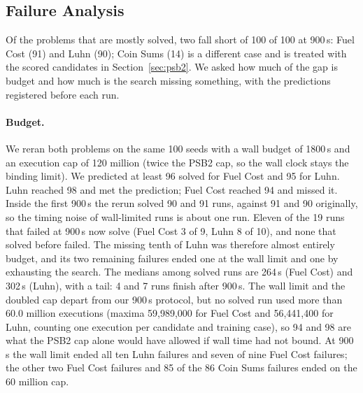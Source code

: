 \documentclass[sigconf,nonacm]{acmart}
\begin{document}
\subsection{Failure Analysis}
\label{sec:failures}
Of the problems that are mostly solved, two fall short of 100 of 100 at 900\,s: Fuel Cost (91) and Luhn (90); Coin Sums (14) is a different case and is treated with the scored candidates in Section~\ref{sec:psb2}. We asked how much of the gap is budget and how much is the
search missing something, with the predictions registered before each run.

\paragraph{Budget.} We reran both problems on the same 100 seeds with a wall budget of 1800\,s and an execution cap of 120 million (twice the PSB2
cap, so the wall clock stays the binding limit). We predicted at least 96 solved for Fuel Cost and 95 for Luhn. Luhn reached 98 and met the
prediction; Fuel Cost reached 94 and missed it. Inside the first 900\,s the rerun solved 90 and 91 runs, against 91 and 90 originally, so
the timing noise of wall-limited runs is about one run. Eleven of the 19 runs that failed at 900\,s now solve (Fuel Cost 3 of 9, Luhn 8 of 10),
and none that solved before failed. The missing tenth of Luhn was therefore almost entirely budget, and its two remaining failures ended one at the wall limit and one by exhausting the search. The medians among solved runs are 264\,s (Fuel Cost) and 302\,s (Luhn), with a tail: 4 and 7 runs finish after 900\,s.
The wall limit and the doubled cap depart from our 900\,s protocol, but no solved run used more than 60.0 million executions (maxima 59,989,000 for Fuel Cost and 56,441,400 for Luhn, counting one execution per candidate and training case), so 94 and 98 are what the PSB2 cap alone would have allowed if wall time had not bound. At 900\,s the wall limit ended all ten Luhn failures and seven of nine Fuel Cost failures; the other two Fuel Cost failures and 85 of the 86 Coin Sums failures ended on the 60 million cap.
\end{document}
